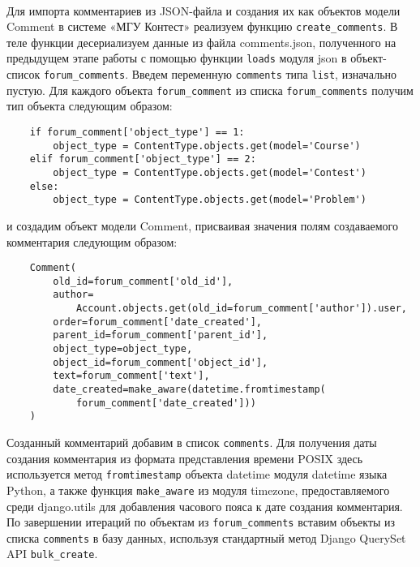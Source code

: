 \documentclass[12pt, a4paper, oneside]{article}
\begin{document}
\paragraph{}
Для импорта комментариев из JSON-файла и создания их как объектов модели Comment в системе «МГУ Контест» реализуем функцию \texttt{create\_comments}. В теле функции десериализуем данные из файла comments.json, полученного на предыдущем этапе работы с помощью функции \texttt{loads} модуля json в объект-список \texttt{forum\_comments}. Введем переменную \texttt{comments} типа \texttt{list}, изначально пустую. Для каждого объекта \texttt{forum\_comment} из списка \texttt{forum\_comments} получим тип объекта следующим образом:
\begin{verbatim}
    if forum_comment['object_type'] == 1:
        object_type = ContentType.objects.get(model='Course')
    elif forum_comment['object_type'] == 2:
        object_type = ContentType.objects.get(model='Contest')
    else:
        object_type = ContentType.objects.get(model='Problem')
\end{verbatim}
и создадим объект модели Comment, присваивая значения полям создаваемого комментария следующим образом:
\begin{verbatim}
    Comment(
        old_id=forum_comment['old_id'],
        author=
            Account.objects.get(old_id=forum_comment['author']).user,
        order=forum_comment['date_created'],
        parent_id=forum_comment['parent_id'],
        object_type=object_type,
        object_id=forum_comment['object_id'],
        text=forum_comment['text'],
        date_created=make_aware(datetime.fromtimestamp(
            forum_comment['date_created']))
    )
\end{verbatim}
Созданный комментарий добавим в список \texttt{comments}. Для получения даты создания комментария из формата представления времени POSIX здесь используется метод \texttt{fromtimestamp} объекта datetime модуля datetime языка Python, а также функция \texttt{make\_aware} из модуля timezone, предоставляемого среди django.utils для добавления часового пояса к дате создания комментария. По завершении итераций по объектам из \texttt{forum\_comments} вставим объекты из списка \texttt{comments} в базу данных, используя стандартный метод Django QuerySet API \texttt{bulk\_create}.
\end{document}
